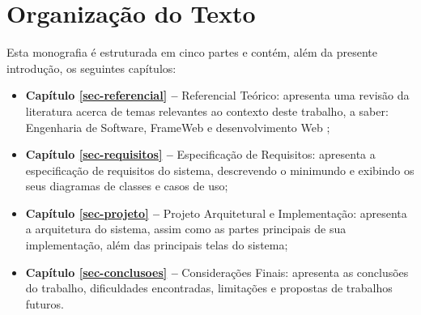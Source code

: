 \section{Organização do Texto}
\label{sec-intro-organizacao}

Esta monografia é estruturada em cinco partes e contém, além da presente introdução, os seguintes capítulos:

\begin{itemize}
	\item \textbf{Capítulo \ref{sec-referencial} --} Referencial Teórico: apresenta uma revisão da literatura acerca de temas relevantes ao contexto deste trabalho, a saber: Engenharia de Software, FrameWeb e desenvolvimento Web ;
	
	\item \textbf{Capítulo \ref{sec-requisitos} --} Especificação de Requisitos: apresenta a especificação de requisitos do sistema, descrevendo o minimundo e exibindo os seus diagramas de classes e casos de uso;
	
	\item \textbf{Capítulo \ref{sec-projeto} --} Projeto Arquitetural e Implementação: apresenta a arquitetura do sistema, assim como as partes principais de sua implementação, além das principais telas do sistema;
	
	\item \textbf{Capítulo \ref{sec-conclusoes} --} Considerações Finais: apresenta as conclusões do trabalho, dificuldades encontradas, limitações e propostas de trabalhos futuros.
\end{itemize}









